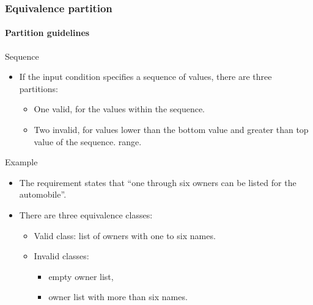 \begin{frame}
\frametitle{Equivalence partition}
\framesubtitle{Partition guidelines}

\begin{block:fact}{Sequence}
\begin{itemize}
	\item If the input condition specifies a sequence of values, there are three
	partitions:
	\begin{itemize}
		\item One valid, for the values within the sequence.

		\item Two invalid, for values lower than the bottom value and greater
		than top value of the sequence.
		range.
	\end{itemize}
\end{itemize}
\end{block:fact}


\begin{block}{Example}
\begin{itemize}
	\item The requirement states that ``one through six owners can be listed
	for the automobile''.

	\item There are three equivalence classes:
	\begin{itemize}
		\item Valid class: list of owners with one to six names.
		\item Invalid classes:
		\begin{itemize}
			\item empty owner list,
			\item owner list with more than six names.
		\end{itemize}
	\end{itemize}
\end{itemize}
\end{block}
\end{frame}



